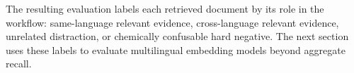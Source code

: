 The resulting evaluation labels each retrieved document by its role in the
workflow: same-language relevant evidence, cross-language relevant evidence,
unrelated distraction, or chemically confusable hard negative. The next section
uses these labels to evaluate multilingual embedding models beyond aggregate
recall.
